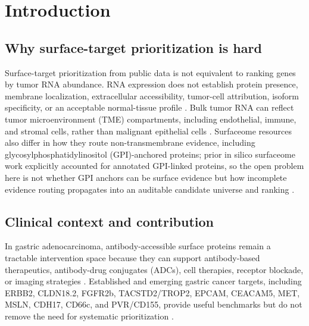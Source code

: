 \documentclass[preprint,12pt,authoryear]{elsarticle}
\begin{document}
\FloatBarrier
\section{Introduction}

\subsection{Why surface-target prioritization is hard}

Surface-target prioritization from public data is not equivalent to ranking genes by tumor RNA abundance. RNA expression does not establish protein presence, membrane localization, extracellular accessibility, tumor-cell attribution, isoform specificity, or an acceptable normal-tissue profile \citep{uhlen2015hpa,uhlen2017pathology,thul2017subcellular,moek2017adc_landscape,li2024bayests}. Bulk tumor RNA can reflect tumor microenvironment (TME) compartments, including endothelial, immune, and stromal cells, rather than malignant epithelial cells \citep{yoshihara2013estimate,han2023tisch2,zhang2019gastric_scrna,jeong2021gastric_tme}. Surfaceome resources also differ in how they route non-transmembrane evidence, including glycosylphosphatidylinositol (GPI)-anchored proteins;\allowbreak{} prior in silico surfaceome work explicitly accounted for annotated GPI-linked proteins, so the open problem here is not whether GPI anchors can be surface evidence but how incomplete evidence routing propagates into an auditable candidate universe and ranking \citep{bauschfluck2018surfy}.

\subsection{Clinical context and contribution}

In gastric adenocarcinoma, antibody-accessible surface proteins remain a tractable intervention space because they can support antibody-based therapeutics, antibody-drug conjugates (ADCs), cell therapies, receptor blockade, or imaging strategies \citep{bray2024globocan,tcga2014gastric,hu2021surfaceome,bauschfluck2015cspa,bauschfluck2018surfy,li2022pancancer,razzaghdoust2021adc,kathad2024adc,moek2017adc_landscape,li2026gastric_adc_review,katoh2025adhesion_adc}. Established and emerging gastric cancer targets, including ERBB2, CLDN18.2, FGFR2b, TACSTD2/\allowbreak{}TROP2, EPCAM, CEACAM5, MET, MSLN, CDH17, CD66c, and PVR/\allowbreak{}CD155, provide useful benchmarks but do not remove the need for systematic prioritization \citep{bang2010toga,shah2023spotlight,shitara2023glow,wainberg2022fight,xu2025gastric_targets,chang2026gastric_proteogenomics,zhang2025cd66c,zhao2026pvr,li2026gastric_adc_review,katoh2025adhesion_adc,wang2025cdh17_adc}.
\end{document}
